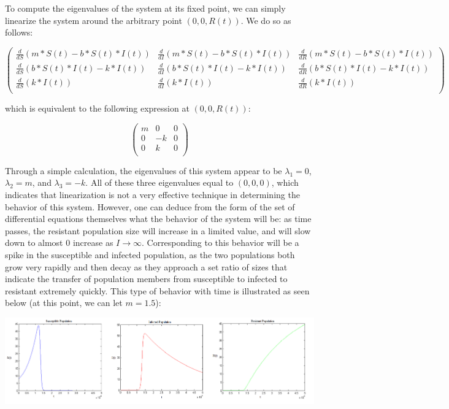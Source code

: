 \documentclass{article}
\begin{document}
To compute the eigenvalues of the system at its fixed point, we can simply linearize the system around the arbitrary point $(0,0,R(t))$. We do so as follows: 
\begin{center}
\begin{equation*}
\begin{pmatrix}
    \frac{d}{dS}(m*S(t)-b*S(t)*I(t)) & \frac{d}{dI}(m*S(t)-b*S(t)*I(t)) & \frac{d}{dR}(m*S(t)-b*S(t)*I(t)) \\
    \frac{d}{dS}(b*S(t)*I(t)-k*I(t)) & \frac{d}{dI}(b*S(t)*I(t)-k*I(t)) & \frac{d}{dR}(b*S(t)*I(t)-k*I(t)) \\
    \frac{d}{dS}(k*I(t)) & \frac{d}{dI}(k*I(t)) & \frac{d}{dR}(k*I(t)) \\
\end{pmatrix}
\end{equation*}
\end{center}
which is equivalent to the following expression at $(0,0,R(t))$:
\begin{center}
\begin{equation*}
\begin{pmatrix}
    m & 0 & 0 \\
    0 & -k & 0 \\
    0 & k & 0 \\
\end{pmatrix}
\end{equation*}
\end{center}
Through a simple calculation, the eigenvalues of this system appear to be $\lambda_1=0$, $\lambda_2=m$, and $\lambda_3=-k$. All of these three eigenvalues equal to $(0,0,0)$, which indicates that linearization is not a very effective technique in determining the behavior of this system. However, one can deduce from the form of the set of differential equations themselves what the behavior of the system will be: as time passes, the resistant population size will increase in a limited value, and will slow down to almost $0$ increase as $I \rightarrow \infty$. Corresponding to this behavior will be a spike in the susceptible and infected population, as the two populations both grow very rapidly and then decay as they approach a set ratio of sizes that indicate the transfer of population members from susceptible to infected to resistant extremely quickly. This type of behavior with time is illustrated as seen below (at this point, we can let $m=1.5$):
\begin{center}
\includegraphics[keepaspectratio,width=15cm]{m32.png}
\end{center}
\end{document}
